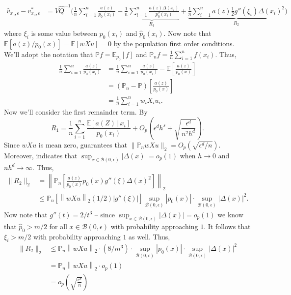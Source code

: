 \documentclass[11pt]{article}
\begin{document}
\begin{align}
    \hat{v}_{x_0, \epsilon} - v^*_{x_0, \epsilon} &= V\hat{Q}^{-1}\bigg(\frac{1}{n}\sum_{i = 1}^n\frac{a(z)}{p_0(x_i)} - \underbrace{\frac{1}{n}\sum_{i = 1}^n\frac{a(z)\Delta(x_i)}{p_0^2(x_i)}}_{R_1} + \underbrace{\frac{1}{n}\sum_{i = 1}^na(z) \frac{1}{2}g''(\xi_i)\Delta(x_i)^2}_{R_2}\bigg) \label{eq: expansion with remainder}
\end{align}
where $\xi_i$ is some value between $p_0(x_i)$ and $\hat{p}_0(x_i)$. Now note that $\mathbb{E}[a(z)/p_0(x)] = \mathbb{E}[wXu] = 0$ by the population first order conditions. We'll adopt the notation that $\mathbb{P}f = \mathbb{E}_{p_0}[f]$ and $\mathbb{P}_nf = \frac{1}{n}\sum_{i = 1}^nf(x_i)$. Thus,
\begin{align*}
    \frac{1}{n}\sum_{i = 1}^n\frac{a(z)}{p_0(x_i)} &= \frac{1}{n}\sum_{i = 1}^n\frac{a(z)}{p_0(x_i)} - \mathbb{E}\left[\frac{a(z)}{p_0(x)}\right] \\
    &= (\mathbb{P}_n -\mathbb{P})\left[\frac{a(z)}{p_0(x)}\right] \\
    &= \frac{1}{n}\sum_{i = 1}^n w_i X_i u_i.
\end{align*}
Now we'll consider the first remainder term. By 
\[R_1 = \frac{1}{n}\sum_{i = 1}^n \frac{\mathbb{E}[a(Z)\,| \,x_i]}{p_0(x_i)} + O_p\left( \epsilon^dh^s + \sqrt{\frac{\epsilon^d}{n^2h^d}}\right).\]
Since $wXu$ is mean zero,  guarantees that $\|\mathbb{P}_nwXu\|_2 = O_p(\sqrt{\epsilon^d/n})$. Moreover,  indicates that $\sup_{x\in \mathcal{B}(0, \epsilon)} \left|\Delta(x)\right| = o_p(1)$ when $h \rightarrow 0$ and $nh^d \rightarrow \infty$. Thus, 
\begin{align*}
    \|R_2\|_2 &= \left\|\mathbb{P}_n\left[\frac{a(z)}{p_0(x)}p_0(x)g''(\xi)\Delta(x)^2\right]\right\|_2\\
    &\leq \mathbb{P}_n[\left\|wXu\right\|_2(1/2)|g''(\xi)|]\sup_{\mathcal{B}(0, \epsilon)}|p_0(x)|\cdot \sup_{\mathcal{B}(0, \epsilon)}|\Delta(x)|^2. 
\end{align*}
Now note that $g''(t) = 2/t^3$  -- since $\sup_{x\in \mathcal{B}(0, \epsilon)} \left|\Delta(x)\right| = o_p(1)$ we know that $\hat{p}_0 > m/2$ for all $x \in \mathcal{B}(0, \epsilon)$ with probability approaching $1$. It follows that $\xi_i > m/2$ with probability approaching $1$ as well. Thus,
\begin{align*}
    \|R_2\|_2 &\leq \mathbb{P}_n\left\|wXu\right\|_2\cdot (8/m^3)\cdot \sup_{\mathcal{B}(0, \epsilon)}|p_0(x)|\cdot \sup_{\mathcal{B}(0, \epsilon)}|\Delta(x)|^2 \\
    &= \mathbb{P}_n\left\|wXu\right\|_2 \cdot o_p(1) \\
    &= o_p\left(\sqrt{\frac{\epsilon^d}{n}}\right)
\end{align*}
\end{document}

